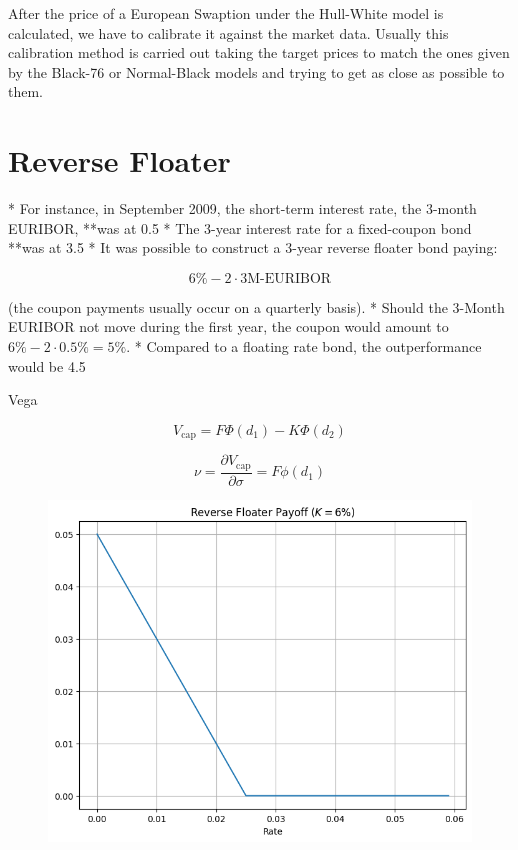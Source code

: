 \documentclass[12pt,a4paper]{article}
\begin{document}
After the price of a European Swaption under the Hull-White model is calculated, we have to calibrate it against the market data. Usually this calibration method is carried out taking the target prices to match the ones given by the Black-76 or Normal-Black models and trying to get as close as possible to them.

\clearpage
\section{Reverse Floater}

* For instance, in September 2009, the short-term interest rate, the 3-month EURIBOR, **was at 0.5%
* The 3-year interest rate for a fixed-coupon bond **was at 3.5%
* It was possible to construct a 3-year reverse floater bond paying:

$$ 6\% - 2 \cdot \text{3M-EURIBOR}$$

(the coupon payments usually occur on a quarterly basis). 
* Should the 3-Month EURIBOR not move during the first year, the coupon would amount to $6\% - 2 \cdot 0.5\% = 5\%$. 
* Compared to a floating rate bond, the outperformance would be 4.5%

Vega 

$$V_{\text{cap}}=F\Phi(d_1) - K\Phi(d_2)$$

$$\nu = \frac{\partial V_{\text{cap}}}{\partial\sigma} =
F\phi(d_1)$$

\begin{figure}[htbp]
	\begin{center}
		\includegraphics[width=0.5\linewidth]{addons/reverse_floater_payoff}
	\end{center}
	\label{fig:reverse_floater_payoff}
\end{figure}
\end{document}
